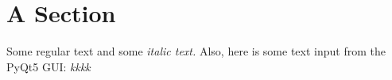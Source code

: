\documentclass{article}%
\begin{document}
%
\normalsize%
\section{A Section}%
\label{sec:ASection}%
Some regular text and some %
\textit{italic text. }%
\newline%
Also, here is some text input from the PyQt5 GUI: %
\textit{kkkk}

%
\end{document}
